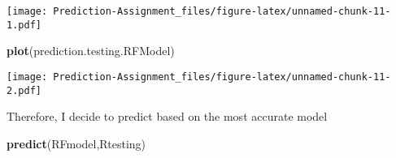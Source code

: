 \documentclass[]{article}
\newenvironment{Shaded}{\begin{snugshade}}{\end{snugshade}}
\newcommand{\KeywordTok}[1]{\textcolor[rgb]{0.13,0.29,0.53}{\textbf{#1}}}
\newcommand{\NormalTok}[1]{#1}
\begin{document}
\texttt{[image: Prediction-Assignment\_files/figure-latex/unnamed-chunk-11-1.pdf]}

\begin{Shaded}
\begin{Highlighting}[]
\KeywordTok{plot}\NormalTok{(prediction.testing.RFModel)}
\end{Highlighting}
\end{Shaded}

\texttt{[image: Prediction-Assignment\_files/figure-latex/unnamed-chunk-11-2.pdf]}

Therefore, I decide to predict based on the most accurate model

\begin{Shaded}
\begin{Highlighting}[]
\KeywordTok{predict}\NormalTok{(RFmodel,Rtesting)}
\end{Highlighting}
\end{Shaded}
\end{document}
